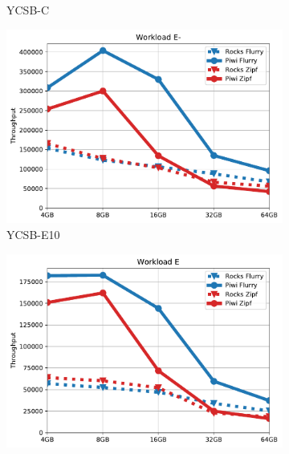 \begin{figure}[tb]
\begin{subfigure}{0.3\linewidth}
\caption{YCSB-C}
\label{fig:throughput:c}
\end{subfigure}
\begin{subfigure}{0.3\linewidth}
\includegraphics[width=\textwidth]{figs/Workload_E-_line.pdf}
\caption{YCSB-E10}
\label{fig:throughput:e10}
\end{subfigure}
\begin{subfigure}{0.3\linewidth}
\includegraphics[width=\textwidth]{figs/Workload_E_line.pdf}

\end{subfigure}
\end{figure}
